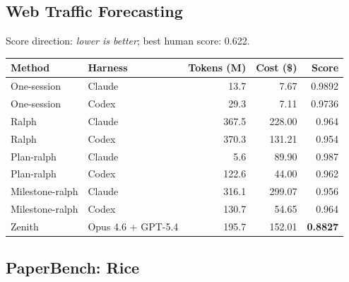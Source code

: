 \documentclass[11pt,a4paper]{article}
\newcommand{\code}[1]{#1}
\begin{document}
\subsection*{Web Traffic Forecasting}

Score direction: \emph{lower is better}; best human score: 0.622.

\noindent\begin{tabular}{@{}llrrr@{}}
\toprule
\rowcolor{tablehead}\textbf{\color{white}Method} & \textbf{\color{white}Harness} & \textbf{\color{white}Tokens (M)} & \textbf{\color{white}Cost (\$)} & \textbf{\color{white}Score} \\
\midrule
\code{One-session}    & Claude              & 13.7  & 7.67    & 0.9892 \\
\rowcolor{tableband}
\code{One-session}    & Codex               & 29.3  & 7.11    & 0.9736 \\
\code{Ralph}          & Claude              & 367.5 & 228.00  & 0.964 \\
\rowcolor{tableband}
\code{Ralph}          & Codex               & 370.3 & 131.21  & 0.954 \\
\code{Plan-ralph}     & Claude              & 5.6   & 89.90   & 0.987 \\
\rowcolor{tableband}
\code{Plan-ralph}     & Codex               & 122.6 & 44.00   & 0.962 \\
\code{Milestone-ralph}& Claude              & 316.1 & 299.07  & 0.956 \\
\rowcolor{tableband}
\code{Milestone-ralph}& Codex               & 130.7 & 54.65   & 0.964 \\
\code{Zenith}         & Opus 4.6 + GPT-5.4  & 195.7 & 152.01  & \textbf{0.8827} \\
\bottomrule
\end{tabular}

\subsection*{PaperBench: Rice}
\end{document}
